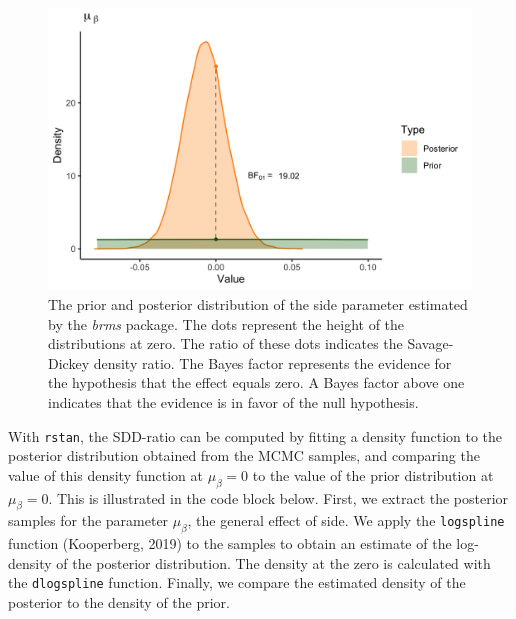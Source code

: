 \documentclass[
  english,
  doc,floatsintext]{apa6}
\begin{document}
\begin{figure}[H]

\includegraphics[width=0.6\linewidth]{Images/Fig16_sdrplotside_v2} \hfill{}

\caption{The prior and posterior distribution of the side parameter estimated by the \textit{brms} package. The dots represent the height of the distributions at zero. The ratio of these dots indicates the Savage-Dickey density ratio. The Bayes factor represents the evidence for the hypothesis that the effect equals zero. A Bayes factor above one indicates that the evidence is in favor of the null hypothesis.}\label{fig:sdratioplotall}
\end{figure}

With \texttt{rstan}, the SDD-ratio can be computed by fitting a density function to the posterior distribution obtained from the MCMC samples, and comparing the value of this density function at \(\mu_{\beta} = 0\) to the value of the prior distribution at \(\mu_{\beta} = 0\). This is illustrated in the code block below. First, we extract the posterior samples for the parameter \(\mu_{\beta}\), the general effect of side. We apply the \texttt{logspline} function (Kooperberg, 2019) to the samples to obtain an estimate of the log-density of the posterior distribution. The density at the zero is calculated with the \texttt{dlogspline} function. Finally, we compare the estimated density of the posterior to the density of the prior.

\scriptsize
\end{document}
